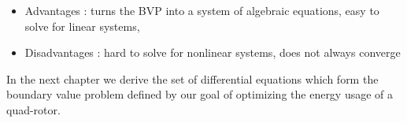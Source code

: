 \begin{itemize}
\item Advantages : turns the BVP into a system of algebraic equations, easy to solve for linear systems,
\item Disadvantages : hard to solve for nonlinear systems, does not always converge
\end{itemize}

In the next chapter we derive the set of differential equations which form the boundary value problem defined by our goal of optimizing the energy usage of a quad-rotor.




